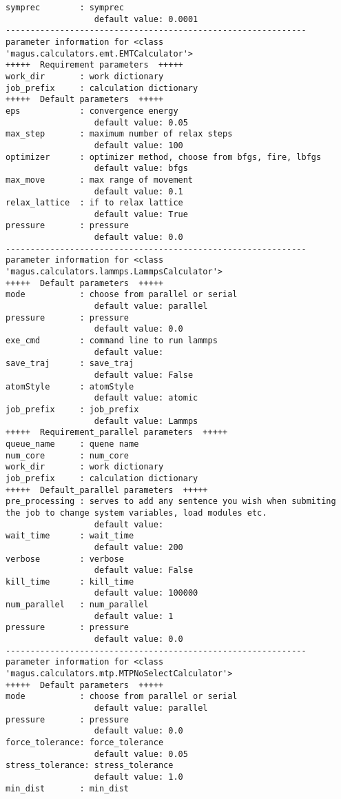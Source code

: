 \documentclass[12pt,oneside]{book}
\begin{document}
\begin{tcolorbox}
\begin{verbatim}
symprec        : symprec
                  default value: 0.0001
-------------------------------------------------------------
parameter information for <class 'magus.calculators.emt.EMTCalculator'>
+++++  Requirement parameters  +++++
work_dir       : work dictionary
job_prefix     : calculation dictionary
+++++  Default parameters  +++++
eps            : convergence energy
                  default value: 0.05
max_step       : maximum number of relax steps
                  default value: 100
optimizer      : optimizer method, choose from bfgs, fire, lbfgs
                  default value: bfgs
max_move       : max range of movement
                  default value: 0.1
relax_lattice  : if to relax lattice
                  default value: True
pressure       : pressure
                  default value: 0.0
-------------------------------------------------------------
parameter information for <class 'magus.calculators.lammps.LammpsCalculator'>
+++++  Default parameters  +++++
mode           : choose from parallel or serial
                  default value: parallel
pressure       : pressure
                  default value: 0.0
exe_cmd        : command line to run lammps
                  default value: 
save_traj      : save_traj
                  default value: False
atomStyle      : atomStyle
                  default value: atomic
job_prefix     : job_prefix
                  default value: Lammps
+++++  Requirement_parallel parameters  +++++
queue_name     : quene name
num_core       : num_core
work_dir       : work dictionary
job_prefix     : calculation dictionary
+++++  Default_parallel parameters  +++++
pre_processing : serves to add any sentence you wish when submiting the job to change system variables, load modules etc.
                  default value: 
wait_time      : wait_time
                  default value: 200
verbose        : verbose
                  default value: False
kill_time      : kill_time
                  default value: 100000
num_parallel   : num_parallel
                  default value: 1
pressure       : pressure
                  default value: 0.0
-------------------------------------------------------------
parameter information for <class 'magus.calculators.mtp.MTPNoSelectCalculator'>
+++++  Default parameters  +++++
mode           : choose from parallel or serial
                  default value: parallel
pressure       : pressure
                  default value: 0.0
force_tolerance: force_tolerance
                  default value: 0.05
stress_tolerance: stress_tolerance
                  default value: 1.0
min_dist       : min_dist

\end{verbatim}
\end{tcolorbox}
\end{document}

